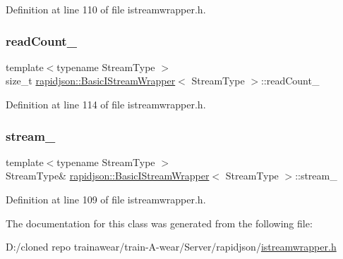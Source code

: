 Definition at line 110 of file istreamwrapper.\+h.

\mbox{\label{classrapidjson_1_1_basic_i_stream_wrapper_aa31e373a95bd662b7fcb3347e83419b9}} 
\subsubsection{\texorpdfstring{readCount\_}{readCount\_}}
{\footnotesize\ttfamily template$<$typename Stream\+Type $>$ \\
size\+\_\+t \mbox{\hyperlink{classrapidjson_1_1_basic_i_stream_wrapper}{rapidjson\+::\+Basic\+I\+Stream\+Wrapper}}$<$ Stream\+Type $>$\+::read\+Count\+\_\+\hspace{0.3cm}{\ttfamily [private]}}



Definition at line 114 of file istreamwrapper.\+h.

\mbox{\label{classrapidjson_1_1_basic_i_stream_wrapper_aa2da48b0eedc0c1e4352e6130a7d57e0}} 
\subsubsection{\texorpdfstring{stream\_}{stream\_}}
{\footnotesize\ttfamily template$<$typename Stream\+Type $>$ \\
Stream\+Type\& \mbox{\hyperlink{classrapidjson_1_1_basic_i_stream_wrapper}{rapidjson\+::\+Basic\+I\+Stream\+Wrapper}}$<$ Stream\+Type $>$\+::stream\+\_\+\hspace{0.3cm}{\ttfamily [private]}}



Definition at line 109 of file istreamwrapper.\+h.



The documentation for this class was generated from the following file\+:\begin{DoxyCompactItemize}
\item 
D\+:/cloned repo trainawear/train-\/\+A-\/wear/\+Server/rapidjson/\mbox{\hyperlink{istreamwrapper_8h}{istreamwrapper.\+h}}\end{DoxyCompactItemize}
